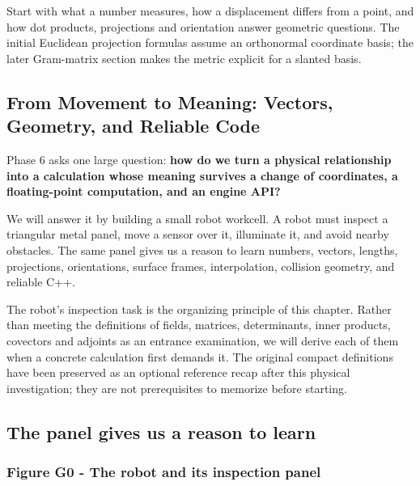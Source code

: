 \hypertarget{01-foundations-i-ch017-movement-becomes-geometry}{}

Start with what a number measures, how a displacement differs from a point, and how dot products, projections and orientation answer geometric questions. The initial Euclidean projection formulas assume an orthonormal coordinate basis; the later Gram-matrix section makes the metric explicit for a slanted basis.

\subsection{From Movement to Meaning: Vectors, Geometry, and Reliable Code}\label{01-foundations-i-ch017-from-movement-to-meaning-vectors-geometry-and-reliable-code}

\hypertarget{01-foundations-i-ch017-from-movement-to-meaning-vectors-geometry-and-reliable-code}{}

Phase 6 asks one large question: \textbf{how do we turn a physical relationship into a calculation whose meaning survives a change of coordinates, a floating-point computation, and an engine API?}

We will answer it by building a small robot workcell. A robot must inspect a triangular metal panel, move a sensor over it, illuminate it, and avoid nearby obstacles. The same panel gives us a reason to learn numbers, vectors, lengths, projections, orientations, surface frames, interpolation, collision geometry, and reliable C++.

The robot's inspection task is the organizing principle of this chapter. Rather than meeting the definitions of fields, matrices, determinants, inner products, covectors and adjoints as an entrance examination, we will derive each of them when a concrete calculation first demands it. The original compact definitions have been preserved as an optional {reference recap} after this physical investigation; they are not prerequisites to memorize before starting.

\subsection{The panel gives us a reason to learn}\label{01-foundations-i-ch017-the-panel-gives-us-a-reason-to-learn}

\hypertarget{01-foundations-i-ch017-the-panel-gives-us-a-reason-to-learn}{}

\subsubsection{Figure G0 - The robot and its inspection panel}\label{01-foundations-i-ch017-figure-g0---the-robot-and-its-inspection-panel}

